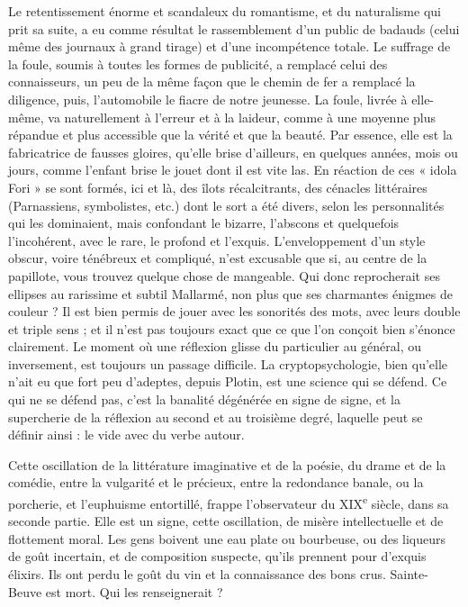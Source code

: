 \documentclass[french,twoside]{book} %
\begin{document}
Le retentissement énorme et scandaleux du romantisme, et du naturalisme qui prit sa suite, a eu comme résultat le rassemblement d’un public de badauds (celui même des journaux à grand tirage) et d’une incompétence totale. Le suffrage de la foule, soumis à toutes les formes de publicité, a remplacé celui des connaisseurs, un peu de la même façon que le chemin de fer a remplacé la diligence, puis, l’automobile le fiacre de notre jeunesse. La foule, livrée à elle-même, va naturellement à l’erreur et à la laideur, comme à une moyenne plus répandue et plus accessible que la vérité et que la beauté. Par essence, elle est la fabricatrice de fausses gloires, qu’elle brise d’ailleurs, en quelques années, mois ou jours, comme l’enfant brise le jouet dont il est vite las. En réaction de ces « idola Fori » se sont formés, ici et là, des îlots récalcitrants, des cénacles littéraires (Parnassiens, symbolistes, etc.) dont le sort a été divers, selon les personnalités qui les dominaient, mais confondant le bizarre, l’abscons et quelquefois l’incohérent, avec le rare, le profond et l’exquis. L’enveloppement d’un style obscur, voire ténébreux et compliqué, n’est excusable que si, au centre de la papillote, vous trouvez quelque chose de mangeable. Qui donc reprocherait ses ellipses au rarissime et subtil Mallarmé, non plus que ses charmantes énigmes de couleur ? Il est bien permis de jouer avec les sonorités des mots, avec leurs double et triple sens ; et il n’est pas toujours exact que ce que l’on conçoit bien s’énonce clairement. Le moment où une réflexion glisse du particulier au général, ou inversement, est toujours un passage difficile. La cryptopsychologie, bien qu’elle n’ait eu que fort peu d’adeptes, depuis Plotin, est une science qui se défend. Ce qui ne se défend pas, c’est la banalité dégénérée en signe de signe, et la supercherie de la réflexion au second et au troisième degré, laquelle peut se définir ainsi : le vide avec du verbe autour.\par
Cette oscillation de la littérature imaginative et de la poésie, du drame et de la comédie, entre la vulgarité et le précieux, entre la redondance banale, ou la porcherie, et l’euphuisme entortillé, frappe l’observateur du XIX\textsuperscript{e} siècle, dans sa seconde partie. Elle est un signe, cette oscillation, de misère intellectuelle et de flottement moral. Les gens boivent une eau plate ou bourbeuse, ou des liqueurs de goût incertain, et de composition suspecte, qu’ils prennent pour d’exquis élixirs. Ils ont perdu le goût du vin et la connaissance des bons crus. Sainte-Beuve est mort. Qui les renseignerait ?\par
\end{document}
